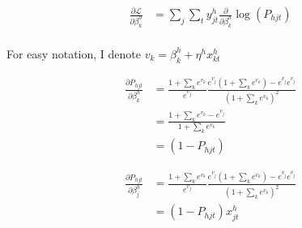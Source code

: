 \documentclass[12pt]{article}
\theoremstyle{plain}
\begin{document}
\begin{align*}
  \frac{\partial \mathcal{L}}{\partial \beta_k^h} &= \sum_j \sum_t y_{jt}^h \frac{\partial}{\partial \beta_k^h} \log(P_{hjt}) \\
\end{align*}

For easy notation, I denote $v_k = \beta_k^h + \eta^h x_{kt}^h$


\begin{align*}
  \frac{\partial P_{hjt}}{\partial \beta_k^h} &= \frac{1 + \sum_k e^{v_k}}{e^{v_j}} \frac{e^{v_j} (1+\sum_k e^{v_k}) - e^{v_j}e^{v_j}}{(1+\sum_k e^{v_k})^2} \\
  &= \frac{1+\sum_k e^{v_k} - e^{v_j}}{1 + \sum_k e^{v_k}} \\
  &= (1-P_{hjt})
\end{align*}


\begin{align*}
  \frac{\partial P_{hjt}}{\partial \beta_j^h} &= \frac{1 + \sum_k e^{v_k}}{e^{v_j}} \frac{e^{v_j} (1+\sum_k e^{v_k}) - e^{v_j}e^{v_j}}{(1+\sum_k e^{v_k})^2} \\
  &= (1-P_{hjt}) x_{jt}^h
\end{align*}
\end{document}
